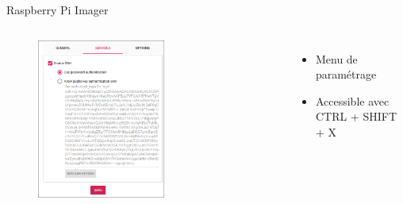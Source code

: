 \documentclass[aspectratio=169,xcolor=dvipsnames]{beamer}
\begin{document}
\begin{frame}{Raspberry Pi Imager}
    \begin{columns}[c] %

        \begin{figure}
            \includegraphics[width=0.6\textwidth]{1/rpi-imager-2.png}
        \end{figure}

        \begin{itemize}
            \item Menu de paramétrage
            \item Accessible avec CTRL + SHIFT + X
        \end{itemize}

    \end{columns}
\end{frame}

\end{document}
